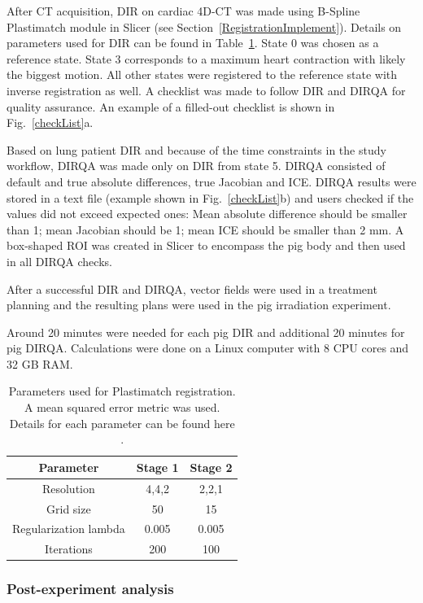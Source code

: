\documentclass[type=dr, dr=rernat, accentcolor=tud7b,colorbacktitle, bigchapter, openright, twoside, 12pt ]{tudthesis}
\begin{document}
After CT acquisition, DIR on cardiac 4D-CT was made using B-Spline Plastimatch module in Slicer (see Section~\ref{RegistrationImplement}). 
Details on parameters used for DIR can be found in Table~\ref{tab:stages2}. State 0 was chosen as a reference state. State 3 corresponds to a maximum heart contraction with likely
the biggest motion. All other states were registered to the reference state with inverse registration as well. 
A checklist was made to follow DIR and DIRQA for quality assurance. An example of a filled-out checklist is shown in Fig.~\ref{checkList}a.

Based on lung patient DIR and because of the time constraints in the study workflow, DIRQA was made only on DIR from state 5. 
DIRQA consisted of default and true absolute differences, true Jacobian and ICE. DIRQA results were stored in a text file (example shown in Fig.~\ref{checkList}b) and users checked if the values did not exceed expected ones: Mean absolute difference
should be smaller than 1; mean Jacobian  should be 1; mean ICE  should be smaller than 2 mm. A box-shaped ROI was created in Slicer to encompass the pig body and then used in all DIRQA checks.

After a successful DIR and DIRQA, vector fields were used in a treatment planning and the resulting plans were used in the pig irradiation experiment.

Around 20 minutes were needed for each pig DIR and additional 20 minutes for pig DIRQA. Calculations were done on a Linux computer with 8 CPU cores and 32 GB RAM.

\begin{table}[H]
  \centering
  \caption{Parameters used for Plastimatch registration.  A mean squared error metric was used. Details for each parameter can be found here \cite{Plastimatch}.}
  \begin{tabular}{c|c|c}
      Parameter & Stage 1 & Stage 2 \\
      \hline
      Resolution & 4,4,2 & 2,2,1 \\
      Grid size & 50 & 15 \\
      Regularization lambda & 0.005 & 0.005 \\
      Iterations & 200 & 100 \\
    \hline\hline
  \end{tabular}
  \label{tab:stages2}
\end{table}

\subsubsection{Post-experiment analysis}
\end{document}

